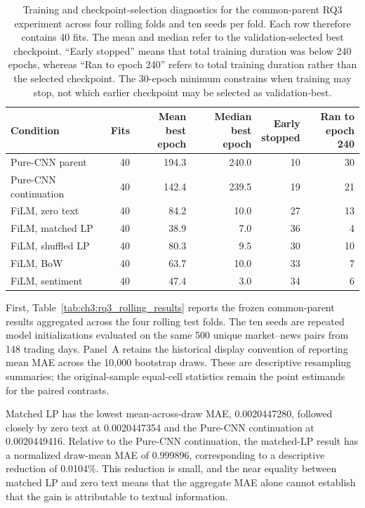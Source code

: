 \begin{table}[htbp]
\centering
\scriptsize
\setlength{\tabcolsep}{4pt}
\begin{tabular}{@{}lrrrrr@{}}
\toprule
Condition
& Fits
& \shortstack{Mean best\\epoch}
& \shortstack{Median best\\epoch}
& \shortstack{Early\\stopped}
& \shortstack{Ran to\\epoch 240} \\
\midrule
Pure-CNN parent       & 40 & 194.3 & 240.0 & 10 & 30 \\
Pure-CNN continuation & 40 & 142.4 & 239.5 & 19 & 21 \\
FiLM, zero text       & 40 &  84.2 &  10.0 & 27 & 13 \\
FiLM, matched LP      & 40 &  38.9 &   7.0 & 36 &  4 \\
FiLM, shuffled LP     & 40 &  80.3 &   9.5 & 30 & 10 \\
FiLM, BoW             & 40 &  63.7 &  10.0 & 33 &  7 \\
FiLM, sentiment       & 40 &  47.4 &   3.0 & 34 &  6 \\
\bottomrule
\end{tabular}
\caption[Training diagnostics for the common-parent RQ3 experiment]{Training and checkpoint-selection diagnostics for the common-parent
RQ3 experiment across four rolling folds and ten seeds per fold. Each row
therefore contains 40 fits. The mean and median refer to the
validation-selected best checkpoint. ``Early stopped'' means that total
training duration was below 240 epochs, whereas ``Ran to epoch 240'' refers
to total training duration rather than the selected checkpoint. The
30-epoch minimum constrains when training may stop, not which earlier
checkpoint may be selected as validation-best.}
\label{tab:ch3:rq3_training_diagnostics}
\end{table}

First, Table~\ref{tab:ch3:rq3_rolling_results} reports the frozen
common-parent results aggregated across the four rolling test folds.  The ten
seeds are repeated model initializations evaluated on the same 500 unique
market--news pairs from 148 trading days. Panel~A retains the historical
display convention of reporting mean MAE across the 10,000 bootstrap draws.
These are descriptive resampling summaries; the original-sample equal-cell
statistics remain the point estimands for the paired contrasts.

Matched LP has the lowest mean-across-draw MAE, 0.0020447280, followed
closely by zero text at 0.0020447354 and the Pure-CNN continuation at
0.0020449416. Relative to the Pure-CNN continuation, the matched-LP result has
a normalized draw-mean MAE of 0.999896, corresponding to a descriptive
reduction of 0.0104\%. This reduction is small, and the near equality between matched LP
and zero text means that the aggregate MAE alone cannot establish that the
gain is attributable to textual information.

